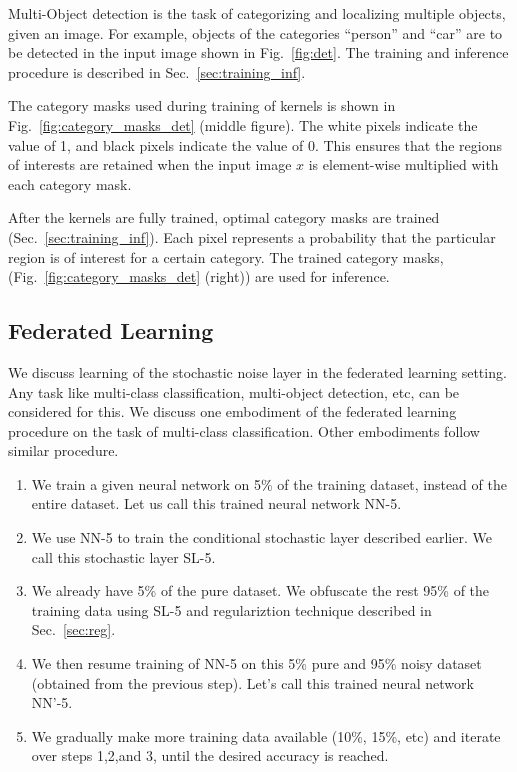 \documentclass[12pt, letterpaper]{article}
\begin{document}
Multi-Object detection is the task of categorizing and localizing multiple objects, given an image. For example, objects of the categories ``person'' and ``car'' are to be detected in the input image shown in Fig.~\ref{fig:det}. The training and inference procedure is described in Sec.~\ref{sec:training_inf}.

The category masks used during training of kernels is shown in Fig.~\ref{fig:category_masks_det} (middle figure). The white pixels indicate the value of 1, and black pixels indicate the value of 0. This ensures that the regions of interests are retained when the input image $x$ is element-wise multiplied with each category mask.

After the kernels are fully trained, optimal category masks are trained (Sec.~\ref{sec:training_inf}). Each pixel represents a probability that the particular region is of interest for a certain category. The trained category masks, (Fig.~\ref{fig:category_masks_det} (right)) are used for inference. 

\subsection{Federated Learning}

We discuss learning of the stochastic noise layer in the federated learning setting. Any task like multi-class classification, multi-object detection, etc, can be considered for this. We discuss one embodiment of the federated learning procedure on the task of multi-class classification. Other embodiments follow similar procedure.

\begin{enumerate}
    \item We train a given neural network on 5\% of the training dataset, instead of the entire dataset. Let us call this trained neural network NN-5.
    \item We use NN-5 to train the conditional stochastic layer described earlier. We call this stochastic layer SL-5.
    \item We already have 5\% of the pure dataset. We obfuscate the rest 95\% of the training data using SL-5 and regulariztion technique described in Sec.~\ref{sec:reg}.  
    \item We then resume training of NN-5 on this 5\% pure and 95\% noisy dataset (obtained from the previous step). Let's call this trained neural network NN’-5.
    \item We gradually make more training data available (10\%, 15\%, etc) and iterate over steps 1,2,and 3, until the desired accuracy is reached.
\end{enumerate}
\end{document}
